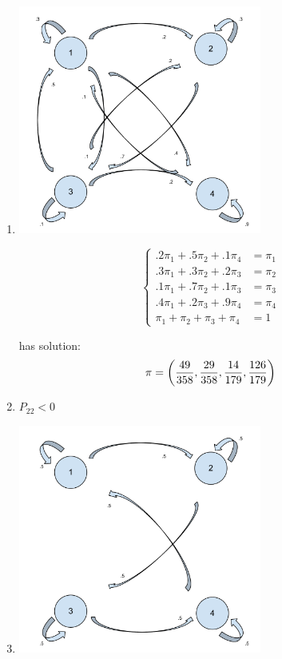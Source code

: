 \documentclass[12pt]{article}
\begin{document}
\begin{enumerate}
\begin{enumerate}
\item
\begin{center}
\includegraphics[width=8cm]{Markov_Chains_Ex_2-e.pdf}
\end{center}
$$
\begin{cases}
.2\pi_1+.5\pi_2+.1\pi_4&=\pi_1\\
.3\pi_1+.3\pi_2+.2\pi_3&=\pi_2\\
.1\pi_1+.7\pi_2+.1\pi_3&=\pi_3\\
.4\pi_1+.2\pi_3+.9\pi_4&=\pi_4\\
\pi_1+\pi_2+\pi_3+\pi_4&=1
\end{cases}$$

has solution:
$$
\pi=\left({49\over 358},{29\over 358},{14\over 179},{126\over 179}\right)
$$


\item $P_{22}<0$
\item

\begin{center}
\includegraphics[width=8cm]{Markov_Chains_Ex_2-g.pdf}
\end{center}


\end{enumerate}
\end{enumerate}
\end{document}
